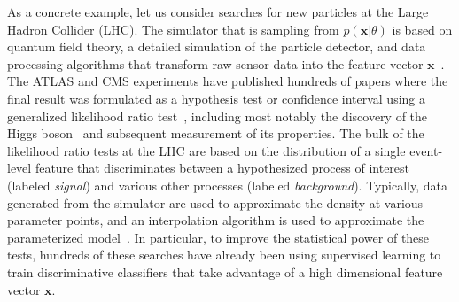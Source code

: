 \documentclass[12pt]{article}
\numberwithin{equation}{section}
\theoremstyle{plain}
\begin{document}
As a concrete example, let us consider searches for new particles at the Large
Hadron Collider (LHC). The simulator that is sampling from $p(\mathbf{x}|\theta)$ is
based on quantum field theory, a detailed simulation of the particle detector,
and data processing algorithms that transform raw sensor data into the feature
vector $\mathbf{x}$~\citep{Sjostrand:2006za,Agostinelli:2002hh}. The ATLAS and CMS
experiments have published  hundreds of papers where the final result was
formulated as a hypothesis test or confidence interval using a generalized
likelihood ratio test~\citep{Cowan:2010js}, including most notably the discovery
of the Higgs boson~\citep{Aad:2012tfa,Chatrchyan:2012ufa} and subsequent
measurement of its properties. The bulk of the likelihood ratio tests at the LHC
are based on the distribution of a single event-level feature that discriminates
between a hypothesized process of interest (labeled \textit{signal}) and various
other processes (labeled \textit{background}). Typically, data generated from the
simulator are used to approximate the density at various parameter points, and
an interpolation algorithm is used to approximate the parameterized
model~\citep{Cranmer:2012sba}. In particular, to improve the statistical power
of these tests, hundreds of these searches have already been using supervised
learning to train discriminative classifiers that take advantage of a high
dimensional feature vector $\mathbf{x}$.

%
\end{document}
